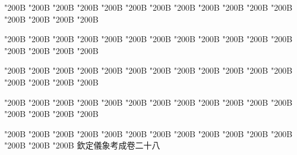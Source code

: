 \begin{正文}
\char"200B\relax{}
\char"200B\relax{}
\char"200B\relax{}
\char"200B\relax{}
\char"200B\relax{}
\char"200B\relax{}
\char"200B\relax{}
\char"200B\relax{}
\char"200B\relax{}
\char"200B\relax{}
\char"200B\relax{}
\char"200B\relax{}
\char"200B\relax{}
\char"200B\relax{}
\char"200B\relax{}
\char"200B\relax
{}\par
\end{正文}\clearpage
{}
\begin{正文}
\char"200B\relax{}
\char"200B\relax{}
\char"200B\relax{}
\char"200B\relax{}
\char"200B\relax{}
\char"200B\relax{}
\char"200B\relax{}
\char"200B\relax{}
\char"200B\relax{}
\char"200B\relax{}
\char"200B\relax{}
\char"200B\relax{}
\char"200B\relax{}
\char"200B\relax{}
\char"200B\relax{}
\char"200B\relax
{}\par
\end{正文}\clearpage
{}
\begin{正文}
\char"200B\relax{}
\char"200B\relax{}
\char"200B\relax{}
\char"200B\relax{}
\char"200B\relax{}
\char"200B\relax{}
\char"200B\relax{}
\char"200B\relax{}
\char"200B\relax{}
\char"200B\relax{}
\char"200B\relax{}
\char"200B\relax{}
\char"200B\relax{}
\char"200B\relax{}
\char"200B\relax{}
\char"200B\relax
{}\par
\end{正文}\clearpage
{}
\begin{正文}
\char"200B\relax{}
\char"200B\relax{}
\char"200B\relax{}
\char"200B\relax{}
\char"200B\relax{}
\char"200B\relax{}
\char"200B\relax{}
\char"200B\relax{}
\char"200B\relax{}
\char"200B\relax{}
\char"200B\relax{}
\char"200B\relax{}
\char"200B\relax{}
\char"200B\relax{}
\char"200B\relax{}
\char"200B\relax
{}\par
\char"200B\relax{}
\char"200B\relax{}
\char"200B\relax{}
\char"200B\relax{}
\char"200B\relax{}
\char"200B\relax{}
\char"200B\relax{}
\char"200B\relax{}
\char"200B\relax{}
\char"200B\relax{}
\char"200B\relax{}
\char"200B\relax{}
\char"200B\relax{}
\char"200B\relax{}
\char"200B\relax{}
欽定儀象考成卷二十八
\par

\par\end{正文}\clearpage
